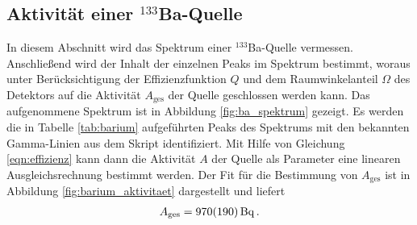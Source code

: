 \subsection{Aktivität einer $^{133}$Ba-Quelle} %
\label{sub:ba_quelle}
In diesem Abschnitt wird das Spektrum einer $^{133}$Ba-Quelle vermessen. Anschließend wird der Inhalt der einzelnen Peaks im Spektrum bestimmt, woraus unter Berücksichtigung der Effizienzfunktion $Q$ und dem Raumwinkelanteil $\Omega$ des Detektors auf die Aktivität $A_\text{ges}$ der Quelle geschlossen werden kann.
Das aufgenommene Spektrum ist in Abbildung \ref{fig:ba_spektrum} gezeigt.
Es werden die in Tabelle \ref{tab:barium} aufgeführten Peaks des Spektrums mit den bekannten Gamma-Linien aus dem Skript identifiziert.
Mit Hilfe von Gleichung \eqref{eqn:effizienz} kann dann die Aktivität $A$ der Quelle als Parameter eine linearen Ausgleichsrechnung bestimmt werden.
Der Fit für die Bestimmung von $A_\text{ges}$ ist in Abbildung \ref{fig:barium_aktivitaet} dargestellt und liefert
\begin{align*}
    A_\text{ges} = \SI{970+-190}{\becquerel}\,.
\end{align*}

